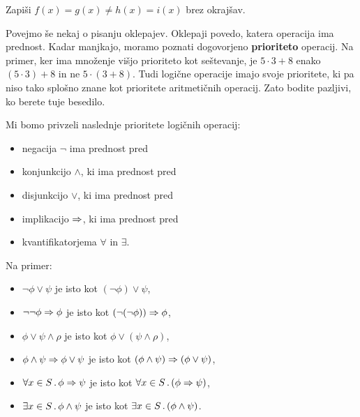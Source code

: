 \begin{vaja}
  Zapiši $f(x) = g(x) \neq h(x) = i(x)$ brez okrajšav.
\end{vaja}

Povejmo še nekaj o pisanju oklepajev. Oklepaji povedo, katera
operacija ima prednost. Kadar manjkajo, moramo poznati dogovorjeno
\textbf{prioriteto} operacij. Na primer, ker ima množenje višjo
prioriteto kot seštevanje, je $5 \cdot 3 + 8$ enako $(5 \cdot 3) + 8$
in ne $5 \cdot (3 + 8)$. Tudi logične operacije imajo svoje
prioritete, ki pa niso tako splošno znane kot prioritete aritmetičnih
operacij. Zato bodite pazljivi, ko berete tuje besedilo.

Mi bomo privzeli naslednje prioritete logičnih operacij:
%
\begin{itemize}
\item negacija $\lnot$ ima prednost pred
\item konjunkcijo $\land$, ki ima prednost pred
\item disjunkcijo $\lor$, ki ima prednost pred
\item implikacijo $\Rightarrow$, ki ima prednost pred
\item kvantifikatorjema $\forall$ in $\exists$.
\end{itemize}
%
Na primer:
%
\begin{itemize}
\item $\lnot \phi \lor \psi$ je isto kot $(\lnot \phi) \lor \psi$,
\item $\lnot \lnot \phi \Rightarrow \phi$ je isto kot $(\lnot(\lnot\phi))
  \Rightarrow \phi$,
\item $\phi \lor \psi \land \rho$ je isto kot $\phi \lor (\psi \land \rho)$,
\item $\phi \land \psi \Rightarrow \phi \lor \psi$ je isto kot $(\phi
  \land \psi) \Rightarrow (\phi \lor \psi)$,
\item $\forall x \in S \,.\, \phi \Rightarrow \psi$ je isto kot $\forall x \in S \,.\, (\phi
    \Rightarrow \psi)$,
\item $\exists x \in S \,.\, \phi \land \psi$ je isto kot $\exists x \in S \,.\, (\phi
    \land \psi)$.
\end{itemize}

